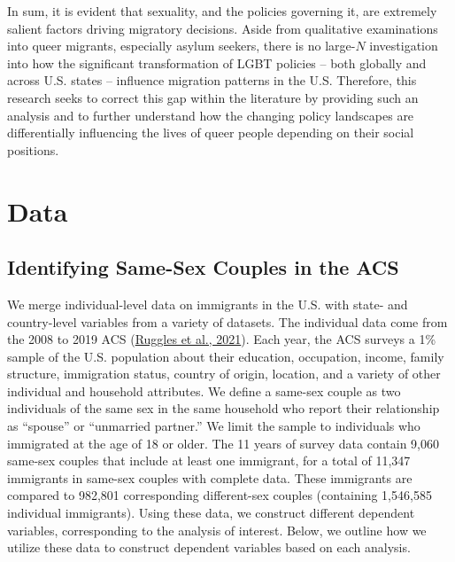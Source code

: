 \documentclass[
  11pt,
]{article}
\begin{document}
In sum, it is evident that sexuality, and the policies governing it, are extremely salient factors driving migratory decisions. Aside from qualitative examinations into queer migrants, especially asylum seekers, there is no large-\(N\) investigation into how the significant transformation of LGBT policies -- both globally and across U.S. states -- influence migration patterns in the U.S. Therefore, this research seeks to correct this gap within the literature by providing such an analysis and to further understand how the changing policy landscapes are differentially influencing the lives of queer people depending on their social positions.

\hypertarget{data}{%
\section{Data}\label{data}}

\hypertarget{identifying-same-sex-couples-in-the-acs}{%
\subsection{Identifying Same-Sex Couples in the ACS}\label{identifying-same-sex-couples-in-the-acs}}

We merge individual-level data on immigrants in the U.S. with state- and country-level variables from a variety of datasets. The individual data come from the 2008 to 2019 ACS (\protect\hyperlink{ref-ruggles_2021}{Ruggles et al., 2021}). Each year, the ACS surveys a 1\% sample of the U.S. population about their education, occupation, income, family structure, immigration status, country of origin, location, and a variety of other individual and household attributes. We define a same-sex couple as two individuals of the same sex in the same household who report their relationship as ``spouse'' or ``unmarried partner.'' We limit the sample to individuals who immigrated at the age of 18 or older. The 11 years of survey data contain 9,060 same-sex couples that include at least one immigrant, for a total of 11,347 immigrants in same-sex couples with complete data. These immigrants are compared to 982,801 corresponding different-sex couples (containing 1,546,585 individual immigrants). Using these data, we construct different dependent variables, corresponding to the analysis of interest. Below, we outline how we utilize these data to construct dependent variables based on each analysis.
\end{document}
